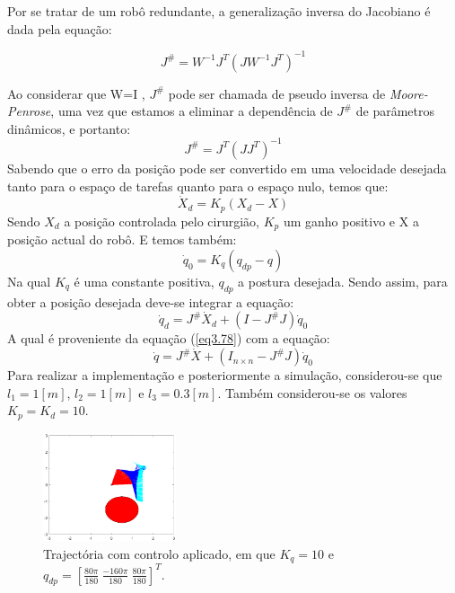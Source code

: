 \documentclass[a4paper,twocolumn,final,11pt]{article}
\let\oldref\ref
\renewcommand{\ref}[1]{(\oldref{#1})}
\begin{document}
Por se tratar de um robô redundante, a generalização inversa do Jacobiano é dada pela equação:

\begin{equation}
    J^{\#}=W^{-1}J^T(JW^{-1}J^T)^{-1}
    \label{eq3.78}
\end{equation}

Ao considerar que W=I , $J^{\#}$ pode ser chamada de pseudo inversa de \textit{Moore-Penrose}, uma vez que estamos a eliminar a dependência de $J^{\#}$ de parâmetros dinâmicos, e portanto:
\begin{equation}
    J^{\#}=J^T(JJ^T)^{-1}
\end{equation}
Sabendo que o erro da posição pode ser convertido em uma velocidade desejada tanto para o espaço de tarefas quanto para o espaço nulo, temos que:
\begin{equation}
    \dot{X}_d=K_p(X_d-X)
\end{equation}
Sendo $X_d$ a posição controlada pelo cirurgião, $K_p$ um ganho positivo e X a posição actual do robô.
E temos também:
\begin{equation}
    \dot{q}_0=K_q(q_{dp}-q)
\end{equation}
Na qual $K_q$ é uma constante positiva, $q_{dp}$ a postura desejada.
Sendo assim, para obter a posição desejada deve-se integrar a equação:
\begin{equation}
    \dot{q}_d= J^{\#}\dot{X}_d+(I-J^{\#}J)\dot{q}_0
\end{equation}
A qual é proveniente da equação \ref{eq3.78} com a equação:
\begin{equation}
     \dot{q}= J^{\#}\dot{X}+(I_{n\times n}-J^{\#}J)\dot{q}_0
\end{equation}
Para realizar a implementação e posteriormente a simulação, considerou-se que $l_1 = 1[m]$, $l_2=1[m]$ e $l_3=0.3[m]$. Também considerou-se os valores $K_p=K_d=10$.
\begin{figure}[H]
	\centering
	\includegraphics[width=0.35\textwidth]{qdp2.eps}
	\caption{Trajectória com controlo aplicado, em que $K_q=10$ e $q_{dp}=\left[\frac{80\pi}{180} ~\frac{-160\pi}{180}  ~
\frac{80\pi}{180}\right]^T $.}
\label{qdp2}
\end{figure}
\end{document}
